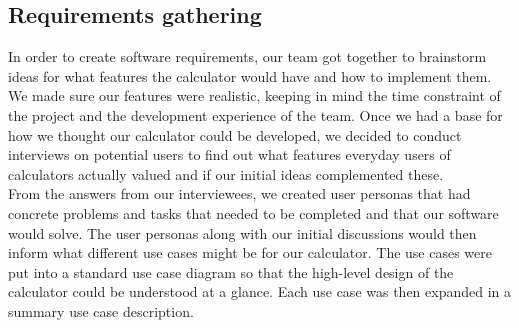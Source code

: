 \documentclass{article}
\begin{document}
\subsection{Requirements gathering}

In order to create software requirements, our team got together to brainstorm ideas for what features the calculator would have and how to implement them. We made sure our features were realistic, keeping in mind the time constraint of the project and the development experience of the team. Once we had a base for how we thought our calculator could be developed, we decided to conduct interviews on potential users to find out what features everyday users of calculators actually valued and if our initial ideas complemented these. \\

From the answers from our interviewees, we created user personas that had concrete problems and tasks that needed to be completed and that our software would solve. The user personas along with our initial discussions would then inform what different use cases might be for our calculator. The use cases were put into a standard use case diagram so that the high-level design of the calculator could be understood at a glance. Each use case was then expanded in a summary use case description.
\end{document}
